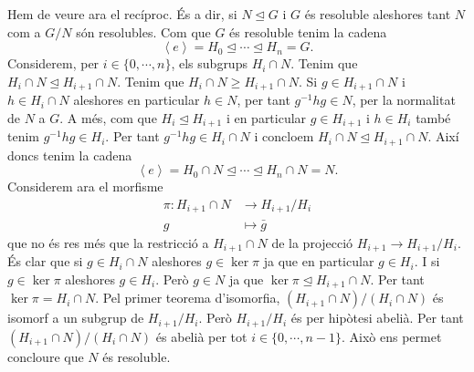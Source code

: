 \documentclass[12pt]{article}
\newcommand{\gen}[1]{\left\langle #1 \right\rangle}
\newcommand{\normal}{\trianglelefteq}
\begin{document}
Hem de veure ara el recíproc. És a dir, si \( N \normal G \) i \( G \) és resoluble aleshores tant \( N \) com a \( G/N \) són resolubles. Com que \( G \) és resoluble tenim la cadena
\begin{equation*}
	\gen{e} = H_0 \normal \cdots \normal H_n = G.
\end{equation*}
Considerem, per \( i \in \{0, \cdots , n \} \), els subgrups \( H_i \cap N \). Tenim que \( H_i \cap N \normal H_{i+1} \cap N \). Tenim que \( H_i \cap N \geq H_{i+1} \cap N \). Si \( g \in H_{i+1} \cap N \) i \( h \in H_i \cap N \) aleshores en particular \( h \in N \), per tant \(  g^{-1}hg \in N \), per la normalitat de \( N \) a \( G \). A més, com que \( H_i \normal H_{i+1} \) i en particular \( g \in H_{i+1} \) i \( h \in H_i \) també tenim \( g^{-1}hg \in H_i \). Per tant \( g^{-1}hg \in H_{i} \cap N \) i concloem \( H_{i} \cap N \normal H_{i+1} \cap N \). Així doncs tenim la cadena
\begin{equation*}
	\gen{e} = H_0 \cap N \normal \cdots \normal H_n \cap N = N.
\end{equation*}
Considerem ara el morfisme
\begin{align*}
	\pi \colon H_{i+1} \cap N & \longrightarrow H_{i+1}/H_i \\
	g & \longmapsto \bar{g}
\end{align*}
que no és res més que la restricció a \( H_{i+1} \cap N \) de la projecció \( H_{i+1} \to H_{i+1}/H_{i} \). És clar que si \( g \in H_i \cap N \) aleshores \( g \in \ker \pi \) ja que en particular \( g \in H_i \). I si \( g \in \ker \pi \) aleshores \( g \in H_i \). Però \( g \in N \) ja que \( \ker \pi \normal H_{i+1} \cap N \). Per tant \( \ker \pi = H_i \cap N \). Pel primer teorema d'isomorfia, \( (H_{i+1} \cap N) / (H_i \cap N) \) és isomorf a un subgrup de \( H_{i+1}/H_i \). Però \( H_{i+1}/H_i \) és per hipòtesi abelià. Per tant \( (H_{i+1} \cap N) / (H_i \cap N) \) és abelià per tot \( i \in \{0, \cdots, n-1\} \). Això ens permet concloure que \( N \) és resoluble.  
\end{document}
